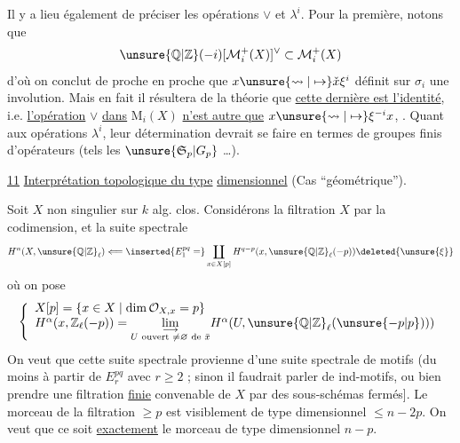 Il y a lieu également de préciser
les opérations $\vee$ et $\lambda^i$. Pour la
première, notons que
\[
\unsure{\mathbb{Q}|\mathbb{Z}}(-i)[\mathcal{M}_i^+(X)]^\vee\subset \mathcal{M}_i^+(X)
\]
d'où on conclut de proche en
proche que $x\unsure{\rightsquigarrow|\mapsto} \check x\xi^i$ définit sur
$\sigma_i$ une involution. Mais en fait il
résultera de la théorie  que
\uline{cette dernière est l'identité}, i.e.
\uline{l'opération} $\vee$ \uline{dans} 
$\mathrm{M}_i(X)$  \uline{n'est
autre que} $x\unsure{\rightsquigarrow|\mapsto}\xi^{-i}x$,
.
Quant aux opérations $\lambda^i$, leur détermination
devrait se faire en termes de groupes finis
d'opérateurs (tels les $\unsure{\mathfrak{S}_p|G_p}$ \ldots).

\uline{11} \uline{Interprétation topologique du type}
 \uline{dimensionnel} (Cas ``géométrique'').

Soit $X$  non singulier sur $k$
alg. clos. Considérons la filtration $X$
par la codimension, et la suite spectrale
\[
H^n(X,\unsure{\mathbb{Q}|\mathbb{Z}}_\ell)
\Longleftarrow
\inserted{E_1^{pq}=}
\coprod_{x\in X[p]}H^{q-p}(x,\unsure{\mathbb{Q}|\mathbb{Z}}_\ell(-p))
\deleted{\unsure{\xi}}
\]
où on pose
\[
\left\{\begin{array}{l}
X[p]=\{x\in X\mid\dim\mathcal{O}_{X,x}=p\}\\
H^\alpha(x,\mathbb{Z}_\ell(-p))=
\underset{\substack{\longrightarrow\\
U\text{ ouvert }\ne\varnothing\text{ de }\bar{x}}}{\lim}
H^\alpha(U,\unsure{\mathbb{Q}|\mathbb{Z}}_\ell(\unsure{-p|p})))
\end{array}\right.
\]
On veut que  cette suite spectrale
provienne d'une suite spectrale de
motifs (du moins à partir de $E_r^{pq}$ avec
$r\geq2$ ; sinon il faudrait parler de
ind-motifs, ou bien prendre une
filtration \uline{finie} convenable de $X$ par des
sous-schémas fermés].
Le morceau
de la filtration $\geq p$ est visiblement de
type dimensionnel $\leq n-2p$. On veut que
ce soit \uline{exactement} le morceau de type
dimensionnel $n-p$.

